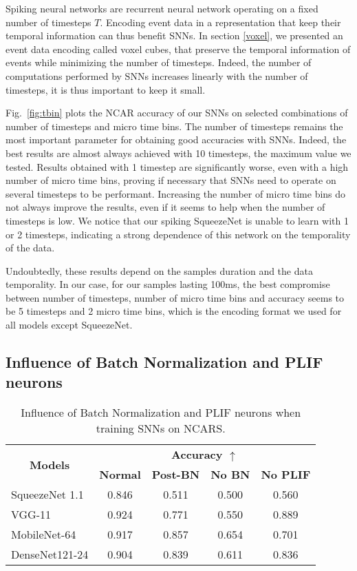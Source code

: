 \documentclass[conference]{IEEEtran}
\begin{document}
Spiking neural networks are recurrent neural network operating on a fixed number of timesteps $T$. Encoding event data in a representation that keep their temporal information can thus benefit SNNs. In section \ref{voxel}, we presented an event data encoding called voxel cubes, that preserve the temporal information of events while minimizing the number of timesteps. Indeed, the number of computations performed by SNNs increases linearly with the number of timesteps, it is thus important to keep it small.

Fig.~\ref{fig:tbin} plots the NCAR accuracy of our SNNs on selected combinations of number of timesteps and micro time bins. The number of timesteps remains the most important parameter for obtaining good accuracies with SNNs. Indeed, the best results are almost always achieved with 10 timesteps, the maximum value we tested. Results obtained with 1 timestep are significantly worse, even with a high number of micro time bins, proving if necessary that SNNs need to operate on several timesteps to be performant. Increasing the number of micro time bins do not always improve the results, even if it seems to help when the number of timesteps is low. We notice that our spiking SqueezeNet is unable to learn with 1 or 2 timesteps, indicating a strong dependence of this network on the temporality of the data.

Undoubtedly, these results depend on the samples duration and the data temporality. In our case, for our samples lasting 100ms, the best compromise between number of timesteps, number of micro time bins and accuracy seems to be 5 timesteps and 2 micro time bins, which is the encoding format we used for all models except SqueezeNet.


\subsection{Influence of Batch Normalization\label{bn} and PLIF neurons}

\begin{table}[]
\renewcommand{\arraystretch}{1.3}
\centering
\caption{Influence of Batch Normalization and PLIF neurons when training SNNs on NCARS.}
\begin{tabular}{lcccc}
\hline
\multicolumn{1}{c}{\multirow{2}{*}{\textbf{Models}}} & \multicolumn{4}{c}{\textbf{Accuracy $\uparrow$}}                                                                                   \\
\multicolumn{1}{c}{}                        & \multicolumn{1}{c}{\textbf{Normal}} & \multicolumn{1}{c}{\textbf{Post-BN}} & \multicolumn{1}{c}{\textbf{No BN}} & \multicolumn{1}{c}{\textbf{No PLIF}} \\
\hline
SqueezeNet 1.1 & 0.846 & 0.511 & 0.500 & 0.560                      \\ 
VGG-11 & 0.924 & 0.771 & 0.550 & 0.889                   \\ 
MobileNet-64 & 0.917 & 0.857 & 0.654 & 0.701  \\ 
DenseNet121-24 & 0.904  & 0.839 & 0.611  & 0.836     \\ 
\hline
\end{tabular}
\label{tab:bn}
\end{table}
\end{document}
